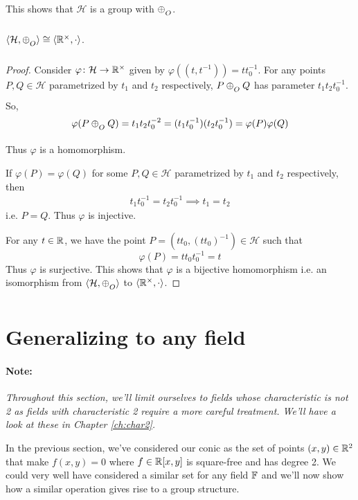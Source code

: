 \noindent
This shows that $\mathcal{H}$ is a group with $\conop$.

\begin{theorem}
    $\langle \mathcal{H},\conop \rangle \cong \langle \R^\times,\cdot \rangle$.
\end{theorem}

\begin{proof}
    Consider $\varphi\colon\mathcal{H} \to \mathbb{R}^\times$ given by
    $\varphi((t,t^{-1})) = t t_0^{-1}$. For any points
    $P,Q\in\mathcal{H}$ parametrized by $t_1$ and $t_2$ respectively,
    $P \conop Q$ has parameter $t_1 t_2 t_0^{-1}$. So,
    \[
        \varphi(P \conop Q) = t_1 t_2 t_0^{-2} = (t_1 t_0^{-1}) (t_2 t_0^{-1})
        = \varphi(P) \varphi(Q)
    \]
    Thus $\varphi$ is a homomorphism.
    \vspace{1ex}

    \noindent
    If $\varphi(P)=\varphi(Q)$ for some $P,Q\in\mathcal{H}$ parametrized by $t_1$
    and $t_2$ respectively, then
    \begin{align*}
        t_1 t_0^{-1} = t_2 t_0^{-1} \implies t_1 = t_2
    \end{align*}
    i.e. $P=Q$. Thus $\varphi$ is injective.
    \vspace{1ex}

    \noindent
    For any $t \in \mathbb{R}$, we have the point
    $P=(t t_0,(t t_0)^{-1}) \in \mathcal{H}$ such that
    \[ \varphi(P) = t t_0 t_0^{-1} = t \]
    Thus $\varphi$ is surjective. This shows that $\varphi$ is a bijective
    homomorphism i.e. an isomorphism from $\langle \mathcal{H},\conop \rangle$ to
    $\langle \mathbb{R}^\times,\cdot \rangle$.
\end{proof}

\section{Generalizing to any field}

\paragraph{Note:} \emph{Throughout this section, we'll limit ourselves to fields
    whose characteristic is not 2 as fields with characteristic 2 require a more
    careful treatment. We'll have a look at these in Chapter \ref{ch:char2}.}
\vspace{1ex}

\noindent
In the previous section, we've considered our conic as the set of points
$(x,y)\in\mathbb{R}^2$ that make $f(x,y)=0$ where $f\in\mathbb{R}[x,y]$ is
square-free and has degree 2. We could very well have considered a similar set
for any field $\mathbb{F}$ and we'll
now show how a similar operation gives rise to a group structure.
\vspace{1ex}

